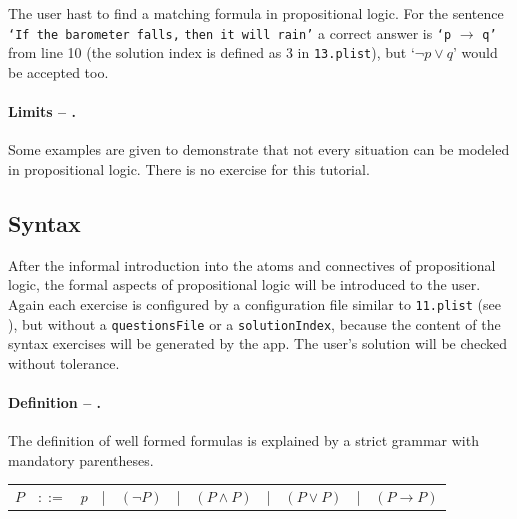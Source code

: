 The user hast to find a matching formula in propositional logic.
For the sentence
\verb+‘If the barometer falls,+ \verb+then it will rain’+ 
a correct answer is
\verb+‘p+ $\rightarrow$ \verb+q’+ 
from line 10 
(the solution index is defined as 3 in \verb+13.plist+),
but 
‘$\neg p \vee q$’ would be accepted too.

\paragraph{Limits – .}
\label{tut:14}
Some examples are given to demonstrate that not every situation can be modeled in propositional logic. 
There is no exercise for this tutorial.

\subsection{Syntax}

After the informal introduction into the atoms and connectives of propositional logic, 
the formal aspects of propositional logic will be introduced to the user.
Again each exercise is configured by a configuration file similar to 
\verb+11.plist+ (see ),
but without a \verb+questionsFile+ or a \verb+solutionIndex+,
because the content of the syntax exercises will be generated by the app.
The user's solution will be checked without tolerance.

\paragraph{Definition – .}
\label{tut:21}
The definition of well formed formulas is explained by a strict grammar with mandatory parentheses.

\begin{center}
\begin{tabular}{rcccccccccc}
$P$	&$::=$	&$p$ 	
	&|		& $(\neg P)$ 
	&|		&  $(P \wedge P)$ 
	&|		&  $(P \vee P)$ 
	&|		&  $(P \rightarrow P)$ \\
\end{tabular}
\end{center}

